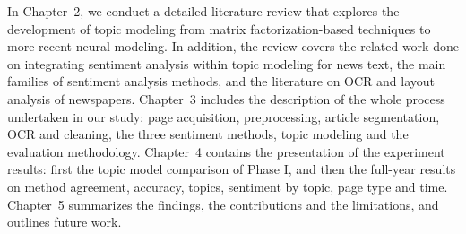 In Chapter~2, we conduct a detailed literature review that explores the development of topic modeling from matrix factorization-based techniques to more recent neural modeling. In addition, the review covers the related work done on integrating sentiment analysis within topic modeling for news text, the main families of sentiment analysis methods, and the literature on OCR and layout analysis of newspapers. Chapter~3 includes the description of the whole process undertaken in our study: page acquisition, preprocessing, article segmentation, OCR and cleaning, the three sentiment methods, topic modeling and the evaluation methodology. Chapter~4 contains the presentation of the experiment results: first the topic model comparison of Phase I, and then the full-year results on method agreement, accuracy, topics, sentiment by topic, page type and time. Chapter~5 summarizes the findings, the contributions and the limitations, and outlines future work.
